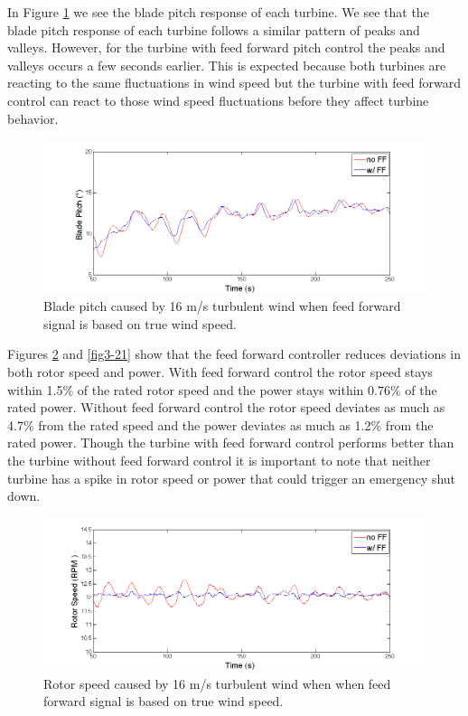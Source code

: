 In Figure \ref{fig3-19} we see the blade pitch response of each turbine. We see that the blade pitch response of each turbine follows a similar pattern of peaks and valleys. However, for the turbine with feed forward pitch control the peaks and valleys occurs a few seconds earlier. This is expected because both turbines are reacting to the same fluctuations in wind speed but the turbine with feed forward control can react to those wind speed fluctuations before they affect turbine behavior. 

\begin{figure}[htb]
	\centering
		\includegraphics[width = \linewidth]{Figures/ch3Figures/fig3-19.png}
		
	\caption{Blade pitch caused by 16 m/s turbulent wind when feed forward signal is based on true wind speed.}
	\label{fig3-19}
\end{figure}

Figures \ref{fig3-20} and \ref{fig3-21} show that the feed forward controller  reduces deviations in both rotor speed and power. With feed forward control the rotor speed stays within 1.5$\%$ of the rated rotor speed and the power stays within 0.76$\%$ of the rated power. Without feed forward control the rotor speed deviates as much as 4.7$\%$ from the rated speed and the power deviates as much as 1.2$\%$ from the rated power. Though the turbine with feed forward control performs better than the turbine without feed forward control it is important to note that neither turbine has a spike in rotor speed or power that could trigger an emergency shut down.

\begin{figure}[htb]
	\centering
		\includegraphics[width = \linewidth]{Figures/ch3Figures/fig3-20.png}
		
	\caption{Rotor speed caused by 16 m/s turbulent wind when when feed forward signal is based on true wind speed.}
	\label{fig3-20}
\end{figure}

